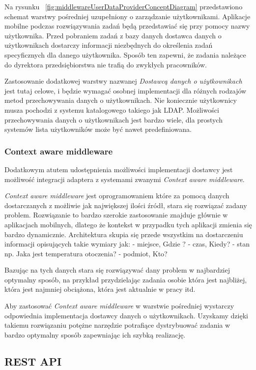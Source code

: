 Na rysunku ~\ref{fig:middlewareUserDataProviderConceptDiagram} przedstawiono schemat warstwy pośredniej uzupełniony o zarządzanie użytkownikami. Aplikacje mobilne podczas rozwiązywania zadań będą przedstawiać się przy pomocy nazwy użytkownika. Przed pobraniem zadań z bazy danych dostawca danych o użytkownikach dostarczy informacji niezbędnych do określenia zadań specyficznych dla danego użytkownika. Sposób ten zapewni, że zadania należące do dyrektora przedsiębiorstwa nie trafią do zwykłych pracowników. 

Zastosowanie dodatkowej warstwy nazwanej \textit{Dostawcą danych o użytkownikach} jest tutaj celowe, i będzie wymagać osobnej implementacji dla różnych rodzajów metod przechowywania danych o użytkownikach. Nie koniecznie użytkownicy musza pochodzi z systemu katalogowego takiego jak LDAP. Możliwości przechowywania danych o użytkownikach jest bardzo wiele, dla prostych systemów lista użytkowników może być nawet predefiniowana.

\subsubsection{Context aware middleware}
Dodatkowym atutem udostępnienia możliwości implementacji dostawcy jest możliwość integracji adaptera z systemami zwanymi \textit{Context aware middleware}. 

\textit{Context aware middleware} jest oprogramowaniem które za pomocą danych dostarczanych z możliwie jak największej ilości źródł, stara się rozwiązać zadany problem. Rozwiązanie to bardzo szerokie zastosowanie znajduje głównie w aplikacjach mobilnych, dlatego że kontekst w przypadku tych aplikacji zmienia się bardzo dynamicznie. Architektura skupia się przede wszystkim na dostarczeniu informacji opisujących takie wymiary jak: - miejsce, Gdzie ? - czas, Kiedy? - stan np. Jaka jest temperatura otoczenia? - podmiot, Kto?

Bazując na tych danych stara się rozwiązywać dany problem w najbardziej optymalny sposób, na przykład przydzielając zadania osobie która jest najbliżej, która jest najmniej obciążona, która jest aktualnie w pracy itd.

Aby zastosować \textit{Context aware middleware} w warstwie pośredniej wystarczy odpowiednia implementacja dostawcy danych o użytkownikach. Uzyskamy dzięki takiemu rozwiązaniu potężne narzędzie potrafiące dystrybuować zadania w bardzo optymalny sposób zapewniając ich szybką realizację.  

\subsection{REST API}

